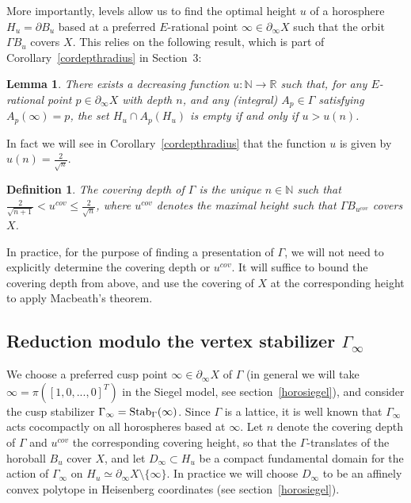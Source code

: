 \documentclass{article}[12pt]
\newcommand{\C}{\mathbb{C}}
\newcommand{\R}{\mathbb{R}}
\newcommand{\N}{\mathbb{N}}
\newcommand{\quat}{\mathbb{H}}
\newcommand{\HCd}{{\rm H}_\C^2}
\newtheorem{lem}{Lemma}%
\newtheorem{dfn}{Definition}%
\begin{document}
More importantly, levels allow us to find the optimal height $u$ of a horosphere $H_u=\partial B_u$ based at a preferred $E$-rational point $\infty \in \partial_\infty X$ such that the orbit $\Gamma B_u$ covers $X$. This relies on the following result, which is part of Corollary~\ref{cordepthradius} in Section~3:


\begin{lem}\label{depth-height} There exists a decreasing function $u: \N \longrightarrow \R$ such that, for any $E$-rational point $p \in \partial_\infty X$ with depth $n$, and any (integral) $A_p \in \Gamma$ satisfying $A_p(\infty)=p$, the set $H_u \cap A_p(H_u)$ is empty if and only if $u > u(n)$.
\end{lem}    

In fact we will see in Corollary~\ref{cordepthradius} that the function $u$ is given by $u(n)=\frac{2}{\sqrt{n}}$.

\begin{dfn} The \emph{covering depth} of $\Gamma$ is the unique $n\in \N$ such that $\frac{2}{\sqrt{n+1}} < u^{cov} \leqslant \frac{2}{\sqrt{n}}$, where $u^{cov}$ denotes the maximal height such that $\Gamma B_{u^{cov}}$ covers $X$.
\end{dfn}

In practice, for the purpose of finding a presentation of $\Gamma$, we will not need to explicitly determine the covering depth or $u^{cov}$. It will suffice to bound the covering depth from above, and use the covering of $X$ at the corresponding height to apply Macbeath's theorem.   

\subsection{Reduction modulo the vertex stabilizer $\Gamma_\infty$}

We choose a preferred cusp point $\infty \in \partial_\infty X$ of $\Gamma$ (in general we will take $\infty=\pi([1,0,...,0]^T)$ in the Siegel model, see section~\ref{horosiegel}), and consider the cusp stabilizer $\Gamma_\infty = {\rm Stab}_\Gamma(\infty)$. Since $\Gamma$ is a lattice, it is well known that $\Gamma_\infty$ acts cocompactly on all horospheres based at $\infty$. Let $n$ denote the covering depth of $\Gamma$ and $u^{cov}$ the corresponding covering height, so that the $\Gamma$-translates of the horoball $B_u$ cover $X$, and let $D_\infty \subset H_u$ be a compact fundamental domain for the action of $\Gamma_\infty$ on $H_u \simeq \partial_\infty X \setminus \{ \infty \}$. In practice we will choose $D_\infty$ to be an affinely convex polytope in Heisenberg coordinates (see section~\ref{horosiegel}).
\end{document}
